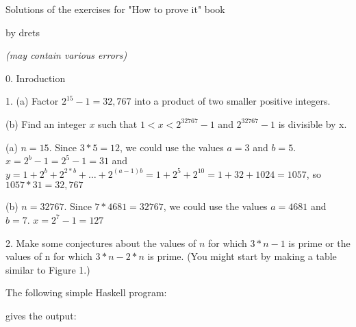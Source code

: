 \documentclass{article}
\begin{document}
\vspace*{\fill}
\centerline{\sc \large Solutions of the exercises for "How to prove it" book }
\centerline{by drets}
\centerline{\textit{(may contain various errors)}}
\vspace*{\fill}
%
\pagebreak
\centerline{\sc \large 0. Inroduction}
\vspace{50pt}

1. (a) Factor $2^{15} - 1 = 32,767$ into a product of two smaller positive integers.

\hspace{12pt}(b) Find an integer $x$ such that $1 < x < 2^{32767} − 1$ and $2^{32767} - 1$ is divisible by x.
\vspace{20pt}


(a) $n = 15$. Since $3 * 5 = 12$, we could use the values $a = 3$ and $b = 5$.
$x = 2^b - 1 = 2^5 - 1 = 31$ and $y = 1 + 2^b + 2^{2*b} + \dotso + 2^{(a-1)b} = 1 + 2^5 + 2^{10} = 1 + 32 + 1024 = 1057$,
so $1057 * 31 = 32,767$
\vspace{10pt}

(b) $n=32767$. Since $7 * 4681 = 32767$, we could use the values $a = 4681$ and $b = 7$.
$x = 2^7 - 1 = 127$
\vspace{40pt}

2. Make some conjectures about the values of $n$ for which $3*n - 1$ is prime or
the values of n for which $3*n - 2*n$ is prime. (You might start by making a
table similar to Figure 1.)
\vspace{20pt}

The following simple Haskell program:

gives the output:
\end{document}
